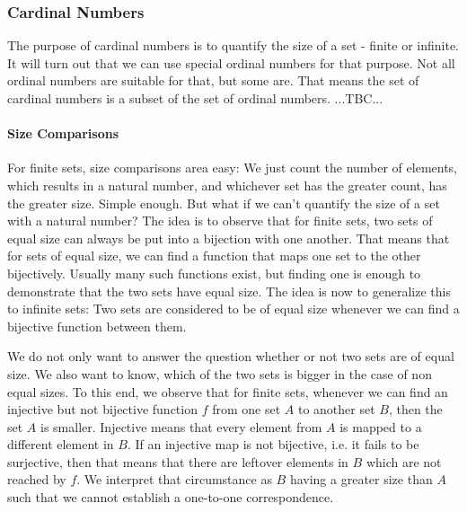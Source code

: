 





\subsubsection{Cardinal Numbers}
The purpose of cardinal numbers is to quantify the size of a set - finite or infinite. It will turn out that we can use special ordinal numbers for that purpose. Not all ordinal numbers are suitable for that, but some are. That means the set of cardinal numbers is a subset of the set of ordinal numbers. 
...TBC...

\paragraph{Size Comparisons}
For finite sets, size comparisons area easy: We just count the number of elements, which results in a natural number, and whichever set has the greater count, has the greater size. Simple enough. But what if we can't quantify the size of a set with a natural number? The idea is to observe that for finite sets, two sets of equal size can always be put into a bijection with one another. That means that for sets of equal size, we can find a function that maps one set to the other bijectively. Usually many such functions exist, but finding one is enough to demonstrate that the two sets have equal size. The idea is now to generalize this to infinite sets: Two sets are considered to be of equal size whenever we can find a bijective function between them.

\medskip
We do not only want to answer the question whether or not two sets are of equal size. We also want to know, which of the two sets is bigger in the case of non equal sizes. To this end, we observe that for finite sets, whenever we can find an injective but not bijective function $f$ from one set $A$ to another set $B$, then the set $A$ is smaller. Injective means that every element from $A$ is mapped to a different element in $B$. If an injective map is not bijective, i.e. it fails to be surjective, then that means that there are leftover elements in $B$ which are not reached by $f$. We interpret that circumstance as $B$ having a greater size than $A$ such that we cannot establish a one-to-one correspondence. 

